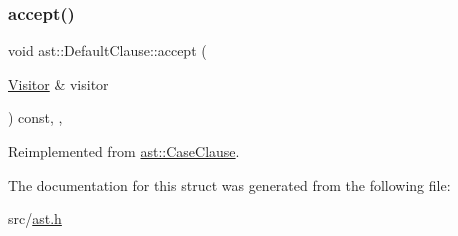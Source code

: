 \subsubsection{\texorpdfstring{accept()}{accept()}}
{\footnotesize\ttfamily void ast\+::\+Default\+Clause\+::accept (\begin{DoxyParamCaption}\item[{\hyperlink{structast_1_1_visitor}{Visitor} \&}]{visitor }\end{DoxyParamCaption}) const\hspace{0.3cm}{\ttfamily [inline]}, {\ttfamily [override]}, {\ttfamily [virtual]}}



Reimplemented from \hyperlink{structast_1_1_case_clause_a070bb52dc711dc7272ab8d2496631723}{ast\+::\+Case\+Clause}.



The documentation for this struct was generated from the following file\+:\begin{DoxyCompactItemize}
\item 
src/\hyperlink{ast_8h}{ast.\+h}\end{DoxyCompactItemize}
